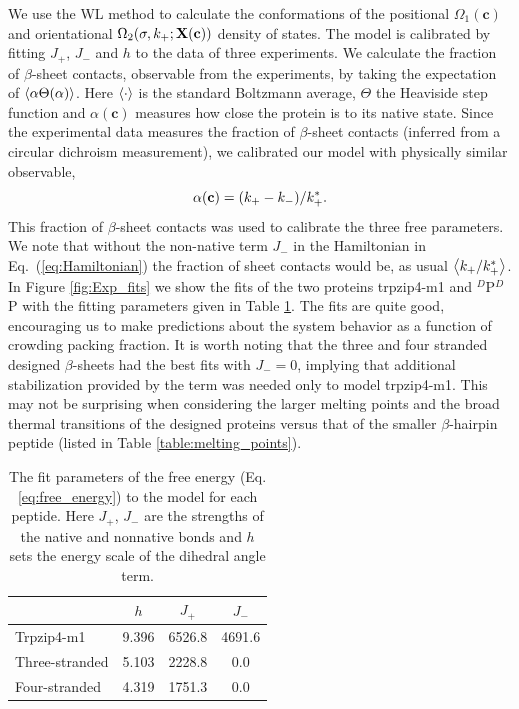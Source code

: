 We use the WL method to calculate the conformations of the positional $\Omega_1 (\mathbf{c})$ and orientational $\Omega_2 (\sigma, k_+; \mathbf{X}(\mathbf{c}))$ density of states. The model is calibrated by fitting $J_+$, $J_-$ and $h$ to the data of three experiments.\cite{xu_probing_2008, mukherjee_effect_2009,du_understanding_2006} We calculate the fraction of $\beta$-sheet contacts, observable from the experiments, by taking the expectation of $\left<  \alpha \Theta(\alpha)  \right>$. Here $\left< \cdot \right>$ is the standard Boltzmann average, $\Theta$ the Heaviside step function and $\alpha(\mathbf{c})$ measures how close the protein is to its native state. Since the experimental data measures the fraction of $\beta$-sheet contacts (inferred from a circular dichroism measurement), we calibrated our model with physically similar observable, 
\begin{equation}
\alpha(\mathbf{c}) = (k_+-k_-)/ k_+^* .
\end{equation}
This fraction of $\beta$-sheet contacts was used to calibrate the three free parameters. We note that without the non-native term $J_-$ in the Hamiltonian in Eq.\ (\ref{eq:Hamiltonian}) the fraction of sheet contacts would be, as usual $\left<  k_+ / k_+^*  \right>$.  In Figure \ref{fig:Exp_fits} we show the fits of the two proteins trpzip4-m1 and $^D$P$^D$P with the fitting parameters given in Table \ref{table:model_parameters}. The fits are quite good, encouraging us to make predictions about the system behavior as a function of crowding packing fraction. It is worth noting that the three and four stranded designed $\beta$-sheets had the best fits with $J_-=0$, implying that additional stabilization provided by the term was needed only to model trpzip4-m1. This may not be surprising when considering the larger melting points and the broad thermal transitions of the designed proteins versus that of the smaller $\beta$-hairpin peptide (listed in Table \ref{table:melting_points}).

\begin{table}
\begin{tabular}{l|c|c|c}             
                & $h$   & $J_+$  & $J_-$  \\ \hline
Trpzip4-m1      & 9.396 & 6526.8 & 4691.6 \\
Three-stranded  & 5.103 & 2228.8 & 0.0    \\
Four-stranded   & 4.319 & 1751.3 & 0.0    \\
 \end{tabular}
 \caption{The fit parameters of the free energy (Eq. \ref{eq:free_energy}) to the model for each peptide. Here  $J_+$, $J_-$ are the strengths of the native and nonnative bonds and $h$ sets the energy scale of the dihedral angle term. }
  \label{table:model_parameters}
\end{table}

